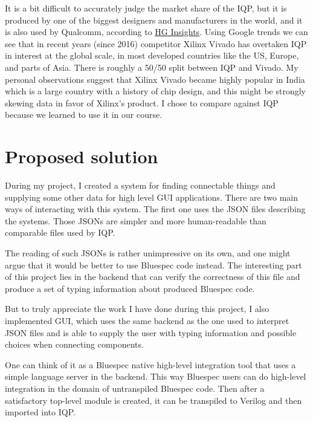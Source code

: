 \documentclass[12pt]{report}
\begin{document}
\begin{tcolorbox}[title=Market share and justification for focusing entirely on comparisons with Intel Quartus Prime]
    It is a bit difficult to accurately judge the market share of the IQP, but it is produced by one of the biggest designers and manufacturers in the world, and it is also used by Qualcomm, according to \href{https://discovery.hgdata.com/product/intel-quartus-prime}{HG Insights}. Using Google trends we can see that in recent years (since 2016) competitor Xilinx Vivado has overtaken IQP in interest at the global scale, in most developed countries like the US, Europe, and parts of Asia. There is roughly a 50/50 split between IQP and Vivado. My personal observations suggest that Xilinx Vivado became highly popular in India which is a large country with a history of chip design, and this might be strongly skewing data in favor of Xilinx's product. I chose to compare against IQP because we learned to use it in our course.
\end{tcolorbox}

\section{Proposed solution}
During my project, I created a system for finding connectable things and supplying some other data for high level GUI applications. There are two main ways of interacting with this system. The first one uses the JSON files describing the systems. Those JSONs are simpler and more human-readable than comparable files used by IQP. 

The reading of such JSONs is rather unimpressive on its own, and one might argue that it would be better to use Bluespec code instead. The interesting part of this project lies in the backend that can verify the correctness of this file and produce a set of typing information about produced Bluespec code.  

But to truly appreciate the work I have done during this project, I also implemented GUI, which uses the same backend as the one used to interpret JSON files and is able to supply the user with typing information and possible choices when connecting components.  

One can think of it as a Bluespec native high-level integration tool that uses a simple language server in the backend. This way Bluespec users can do high-level integration in the domain of untranspiled Bluespec code. Then after a satisfactory top-level module is created, it can be transpiled to Verilog and then imported into IQP. 
\end{document}
